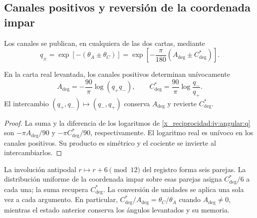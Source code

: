 \subsection{Canales positivos y reversión de la coordenada impar}
\label{x_reciprocidad:iv:angular:canales}

Los canales se publican, en cualquiera de las dos cartas, mediante
\begin{equation}
 q_\pm=\exp[-(\theta_A\pm\theta_C)]
 =\exp\!\left[-\frac{\pi}{180}
                   (A_{\deg}\pm C^*_{\deg})\right].
 \label{x_reciprocidad:iv:angular:q}
\end{equation}

\begin{proposition}
\label{x_reciprocidad:iv:angular:inversion}
En la carta real levantada, los canales positivos determinan
unívocamente
\begin{equation}
 A_{\deg}=-\frac{90}{\pi}\log(q_+q_-),\qquad
 C^*_{\deg}=\frac{90}{\pi}\log\frac{q_-}{q_+}.
 \label{x_reciprocidad:iv:angular:recuperacion}
\end{equation}
El intercambio \((q_+,q_-)\mapsto(q_-,q_+)\) conserva
\(A_{\deg}\) y revierte \(C^*_{\deg}\).
\end{proposition}
\begin{proof}
La suma y la diferencia de los logaritmos de
\eqref{x_reciprocidad:iv:angular:q} son \(-\pi A_{\deg}/90\) y
\(-\pi C^*_{\deg}/90\), respectivamente. El logaritmo real
es unívoco en los canales positivos. Su producto es simétrico
y el cociente se invierte al intercambiarlos.
\end{proof}

La involución antipodal \(r\mapsto r+6\pmod {12}\) del
registro forma seis parejas. La distribución uniforme de la
coordenada impar sobre esas parejas asigna
\(C^*_{\deg}/6\) a cada una; la suma recupera
\(C^*_{\deg}\). La conversión de unidades se aplica una
sola vez a cada argumento. En particular,
\(C^*_{\deg}/A_{\deg}=\theta_C/\theta_A\) cuando
\(A_{\deg}\ne0\), mientras el estado anterior conserva
los ángulos levantados y su memoria.
